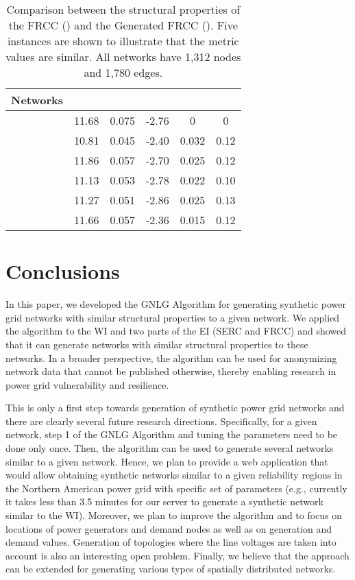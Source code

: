 \documentclass[10pt,journal]{IEEEtran}
\begin{document}
\begin{table}[t]
\centering
\vspace*{-.1cm}
\caption{Comparison between the structural properties of the FRCC () and the Generated FRCC (). Five instances are shown to illustrate that the metric values are similar. All networks have 1,312 nodes and 1,780 edges.}
\vspace*{-0.2cm}
\footnotesize
\begin{tabular}{|l|c|c|c|c|c|}
\hline
Networks& &&  & & \\
\hline
 & 11.68 &0.075 & -2.76 & 0&0\\
\hline
 & 10.81 & 0.045 & -2.40&0.032 & 0.12\\
\hline
 & 11.86 & 0.057 & -2.70 &0.025& 0.12\\
\hline
 & 11.13 & 0.053 & -2.78 &0.022& 0.10\\
\hline
 & 11.27 & 0.051 & -2.86 &0.025& 0.13\\
\hline
 & 11.66 & 0.057 & -2.36 &0.015& 0.12\\
\hline
\end{tabular}
\label{tb:summary_FRCC}
\end{table}
\normalsize
\section{Conclusions}\label{sec:conclusion}

In this paper, we developed the GNLG Algorithm for generating synthetic power grid networks with similar structural properties to a given network. We applied the algorithm to the WI and two parts of the EI (SERC and FRCC) and showed that it can generate networks with similar structural properties to these networks. In a broader perspective, the algorithm can be used for anonymizing network data that cannot be published otherwise, thereby enabling research in power grid vulnerability and resilience.


This is only a first step towards generation of synthetic power grid networks and there are clearly several future research directions. Specifically, for a given network, step 1 of the GNLG Algorithm and tuning the parameters need to be done only once. Then, the algorithm can be used to generate several networks similar to a given network.
Hence, we plan to provide a web application that would allow obtaining synthetic networks similar to a given reliability regions in the Northern American power grid with specific set of parameters (e.g., currently it takes less than 3.5 minutes for our server to generate a synthetic network similar to the WI). Moreover, we plan to improve the algorithm and to focus on locations of power generators and demand nodes as well as on generation and demand values. Generation of topologies where the line voltages are taken into account is also an interesting open problem.
Finally, we believe that the approach can be extended for generating various types of spatially distributed networks.
\end{document}
